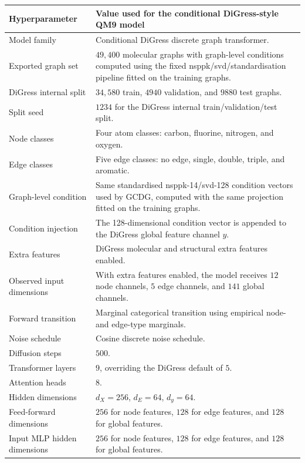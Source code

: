 \begin{table}[p]
\centering
\footnotesize
\begin{tabularx}{\textwidth}{@{}p{}X@{}}
\toprule
Hyperparameter & Value used for the conditional DiGress-style QM9 model \\
\midrule
Model family & Conditional DiGress discrete graph transformer. \\
Exported graph set & \(49{,}400\) molecular graphs with graph-level conditions computed using the fixed \gls{nsppk}/\gls{svd}/standardisation pipeline fitted on the training graphs. \\
DiGress internal split & \(34{,}580\) train, \(4940\) validation, and \(9880\) test graphs. \\
Split seed & \(1234\) for the DiGress internal train/validation/test split. \\
Node classes & Four atom classes: carbon, fluorine, nitrogen, and oxygen. \\
Edge classes & Five edge classes: no edge, single, double, triple, and aromatic. \\
Graph-level condition & Same standardised \gls{nsppk}-14/\gls{svd}-128 condition vectors used by GCDG, computed with the same projection fitted on the training graphs. \\
Condition injection & The 128-dimensional condition vector is appended to the DiGress global feature channel \(y\). \\
Extra features & DiGress molecular and structural extra features enabled. \\
Observed input dimensions & With extra features enabled, the model receives \(12\) node channels, \(5\) edge channels, and \(141\) global channels. \\
Forward transition & Marginal categorical transition using empirical node- and edge-type marginals. \\
Noise schedule & Cosine discrete noise schedule. \\
Diffusion steps & \(500\). \\
Transformer layers & \(9\), overriding the DiGress default of \(5\). \\
Attention heads & \(8\). \\
Hidden dimensions & \(d_X=256\), \(d_E=64\), \(d_y=64\). \\
Feed-forward dimensions & \(256\) for node features, \(128\) for edge features, and \(128\) for global features. \\
Input MLP hidden dimensions & \(256\) for node features, \(128\) for edge features, and \(128\) for global features. \\

\end{tabularx}
\end{table}
